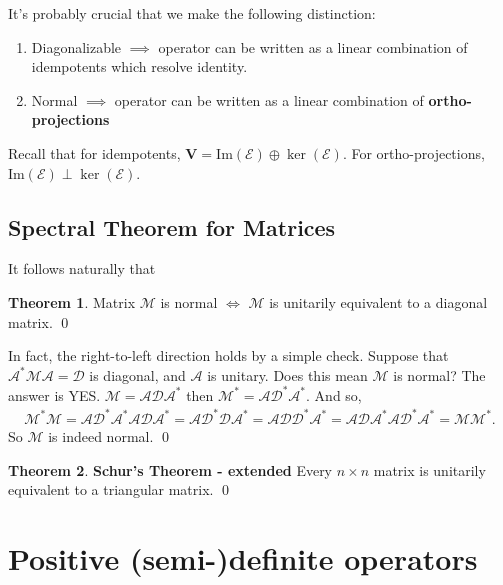 \documentclass{article}
\theoremstyle{definition}
\newtheorem{thm}{Theorem}[section]
\newcommand{\V}{\mathbf{V}}
\newcommand{\A}{\mathcal{A}}
\newcommand{\M}{\mathcal{M}}
\newcommand{\E}{\mathcal{E}}
\newcommand{\ima}{\text{Im}}
\begin{document}
It's probably crucial that we make the following distinction:
\begin{enumerate}
	\item Diagonalizable $\implies$ operator can be written as a linear combination of idempotents which resolve identity.
	\item Normal $\implies$ operator can be written as a linear combination of \textbf{ortho-projections}
\end{enumerate}

Recall that for idempotents, $\V = \ima(\E) \oplus \ker(\E)$. For ortho-projections, $\ima(\E) \perp \ker(\E)$. 



\subsection{Spectral Theorem for Matrices}

It follows naturally that 

\begin{thm}
	Matrix $\M$ is normal $\iff$ $\M$ is unitarily equivalent to a diagonal matrix. \qed
\end{thm}

In fact, the right-to-left direction holds by a simple check. Suppose that $\A^*\M\A = \mathcal{D}$ is diagonal, and $\A$ is unitary. Does this mean $\M$ is normal? The answer is YES. $\M = \A \mathcal{D} \A^*$ then $\M^* = \A \mathcal{D}^* \A^*$. And so,
\begin{align*}
\M^* \M = \A \mathcal{D}^* \A^*\A \mathcal{D} \A^* = \A \mathcal{D}^*\mathcal{D}\A^* = \A \mathcal{D}\mathcal{D}^*\A^* = \A \mathcal{D} \A^*\A \mathcal{D}^* \A^*  =\M\M^*.
\end{align*}
So $\M$ is indeed normal. \qed

\begin{thm}\textbf{Schur's Theorem - extended}
	Every $n\times n$ matrix is unitarily equivalent to a triangular matrix. \qed
\end{thm}






\newpage 

\section{Positive (semi-)definite operators}
\end{document}
